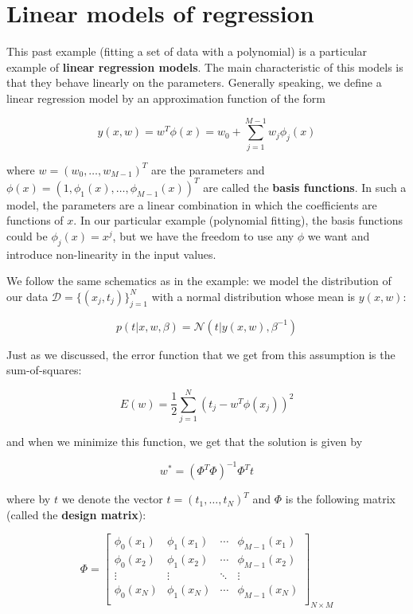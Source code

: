 \documentclass{report}
\begin{document}
\section{Linear models of regression}

This past example (fitting a set of data with a polynomial) is a particular example of \textbf{linear regression models}. The main characteristic of this models is that they behave linearly on the parameters. Generally speaking, we define a linear regression model by an approximation function of the form

\[y(x,w) = w^T\phi(x) = w_0 + \sum_{j=1}^{M-1}w_j\phi_j(x)\]

where $w = (w_0,\dots,w_{M-1})^T$ are the parameters and $\phi(x) = (1, \phi_1(x),\dots, \phi_{M-1}(x))^T$ are called the \textbf{basis functions}. In such a model, the parameters are a linear combination in which the coefficients are functions of $x$. In our particular example (polynomial fitting), the basis functions could be $\phi_j(x) = x^j$, but we have the freedom to use any $\phi$ we want and introduce non-linearity in the input values.

We follow the same schematics as in the example: we model the distribution of our data $\mathcal{D} = \{(x_j, t_j)\}_{j=1}^N$ with a normal distribution whose mean is $y(x,w)$:

\[p(t|x,w,\beta) = \mathcal{N}(t|y(x,w),\beta^{-1})\]

Just as we discussed, the error function that we get from this assumption is the sum-of-squares:

\[E(w) = \frac{1}{2}\sum_{j=1}^N(t_j - w^T\phi(x_j))^2\]

and when we minimize this function, we get that the solution is given by

\[w^* =  (\Phi^T\Phi)^{-1}\Phi^Tt\]

where by $t$ we denote the vector $t = (t_1,\dots, t_N)^T$ and $\Phi$ is the following matrix (called the \textbf{design matrix}):

\[\Phi = \begin{bmatrix}
	\phi_0(x_1)&\phi_1(x_1)&\cdots&\phi_{M-1}(x_1)\\
	\phi_0(x_2)&\phi_1(x_2)&\cdots&\phi_{M-1}(x_2)\\
	\vdots&\vdots&\ddots&\vdots\\
	\phi_0(x_N)&\phi_1(x_N)&\cdots&\phi_{M-1}(x_N)\\
\end{bmatrix}_{N\times M}\]
\end{document}
